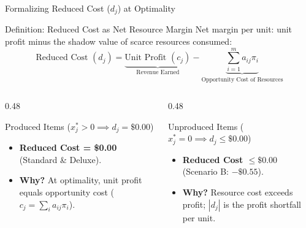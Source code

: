 \documentclass{beamer}
\begin{document}
\begin{frame}{Formalizing Reduced Cost ($d_j$) at Optimality}
\begin{block}{Definition: Reduced Cost as Net Resource Margin}
\small
\setlength{\abovedisplayskip}{3pt}\setlength{\belowdisplayskip}{3pt}
Net margin per unit: unit profit minus the shadow value of scarce resources consumed:
\[
\text{Reduced Cost } (d_j) = \underbrace{\text{Unit Profit } (c_j)}_{\text{Revenue Earned}} - \underbrace{\sum_{i=1}^m a_{ij} \pi_i}_{\text{Opportunity Cost of Resources}}
\]
\end{block}

\vspace{-0.1em}
\begin{columns}[T]
\begin{column}{0.48\textwidth}
\begin{exampleblock}{Produced Items ($x_j^* > 0 \implies d_j = \$0.00$)}
\small
\begin{itemize}\setlength{\itemsep}{0.15em}
  \item \textbf{Reduced Cost = \$0.00} (Standard \& Deluxe).
  \item \textbf{Why?} At optimality, unit profit equals opportunity cost ($c_j = \sum_i a_{ij}\pi_i$).
\end{itemize}
\end{exampleblock}
\end{column}

\begin{column}{0.48\textwidth}
\begin{alertblock}{Unproduced Items ($x_j^* = 0 \implies d_j \le \$0.00$)}
\small
\begin{itemize}\setlength{\itemsep}{0.15em}
  \item \textbf{Reduced Cost $\le \$0.00$} (Scenario B: $-\$0.55$).
  \item \textbf{Why?} Resource cost exceeds profit; $|d_j|$ is the profit shortfall per unit.
\end{itemize}
\end{alertblock}
\end{column}
\end{columns}
\end{frame}
\end{document}
